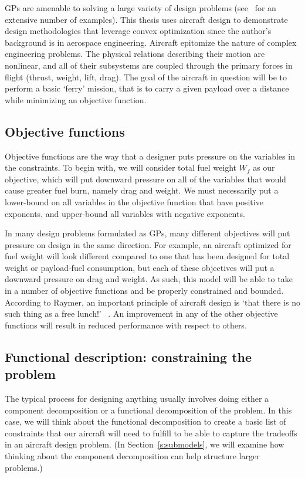 \gls{GP}s are amenable to solving a large variety of design problems (see~\cite{gpintro} for an
extensive number of examples). This thesis uses aircraft design to demonstrate
design methodologies that leverage convex optimization since the author's background is in aerospace engineering.
Aircraft epitomize the nature of complex engineering problems. The physical 
relations describing their motion are nonlinear, and all of their subsystems are 
coupled through the primary forces in flight (thrust, weight, lift, drag).
The goal of the aircraft in question will be to perform a basic `ferry' mission, that
is to carry a given payload
over a distance while minimizing an objective function.

\subsection{Objective functions}
\label{s:objective}

Objective functions are the way that a designer puts pressure on the variables 
in the constraints. To begin with, we will consider
total fuel weight $W_f$ as our objective, which will put
downward pressure on all of the variables that would cause greater fuel burn, namely
drag and weight. We must necessarily put a lower-bound on all variables in the objective function
that have positive exponents, and upper-bound all variables with negative exponents.

In many design problems
formulated as \gls{GP}s, many different objectives will put pressure on design
in the same direction. For example, an aircraft optimized for fuel weight will look
different compared to one
that has been designed for total weight or payload-fuel consumption, but each
of these objectives will put a downward pressure on drag and weight.
As such, this model will be able to take in a number of objective functions
and be properly constrained and bounded. According to Raymer, an important
principle of aircraft design is `that there is no such thing as a free lunch!'
~\cite[pg.26]{raymer}. An improvement in any of the other objective functions
will result in reduced performance with respect to others.

\subsection{Functional description: constraining the problem}

The typical process for designing anything usually involves doing either a
component decomposition or a functional decomposition of the problem. In
this case, we will think about the functional decomposition to create a
basic list of constraints that our aircraft will need to fulfill to be
able to capture the tradeoffs in an aircraft design problem. (In
Section~\ref{s:submodels}, we will examine how thinking about the component decomposition
can help structure larger problems.)

